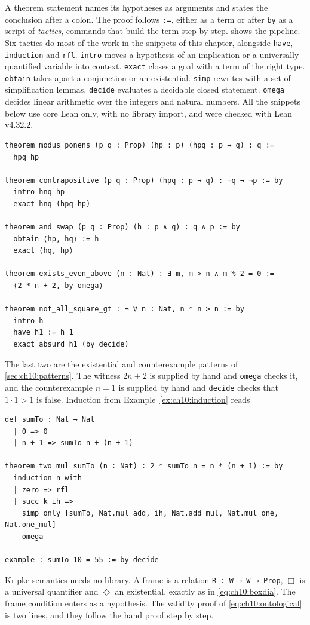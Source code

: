 A theorem statement names its hypotheses as arguments and states the conclusion after a colon. The proof follows \texttt{:=}, either as a term or after \texttt{by} as a script of \emph{tactics}, commands that build the term step by step.  shows the pipeline. Six tactics do most of the work in the snippets of this chapter, alongside \texttt{have}, \texttt{induction} and \texttt{rfl}. \texttt{intro} moves a hypothesis of an implication or a universally quantified variable into context. \texttt{exact} closes a goal with a term of the right type. \texttt{obtain} takes apart a conjunction or an existential. \texttt{simp} rewrites with a set of simplification lemmas. \texttt{decide} evaluates a decidable closed statement. \texttt{omega} decides linear arithmetic over the integers and natural numbers. All the snippets below use core Lean only, with no library import, and were checked with Lean v4.32.2.
\begin{verbatim}
theorem modus_ponens (p q : Prop) (hp : p) (hpq : p → q) : q :=
  hpq hp

theorem contrapositive (p q : Prop) (hpq : p → q) : ¬q → ¬p := by
  intro hnq hp
  exact hnq (hpq hp)

theorem and_swap (p q : Prop) (h : p ∧ q) : q ∧ p := by
  obtain ⟨hp, hq⟩ := h
  exact ⟨hq, hp⟩

theorem exists_even_above (n : Nat) : ∃ m, m > n ∧ m % 2 = 0 :=
  ⟨2 * n + 2, by omega⟩

theorem not_all_square_gt : ¬ ∀ n : Nat, n * n > n := by
  intro h
  have h1 := h 1
  exact absurd h1 (by decide)
\end{verbatim}
The last two are the existential and counterexample patterns of \cref{sec:ch10:patterns}. The witness $2n+2$ is supplied by hand and \texttt{omega} checks it, and the counterexample $n=1$ is supplied by hand and \texttt{decide} checks that $1\cdot1>1$ is false. Induction from Example~\ref{ex:ch10:induction} reads
\begin{verbatim}
def sumTo : Nat → Nat
  | 0 => 0
  | n + 1 => sumTo n + (n + 1)

theorem two_mul_sumTo (n : Nat) : 2 * sumTo n = n * (n + 1) := by
  induction n with
  | zero => rfl
  | succ k ih =>
    simp only [sumTo, Nat.mul_add, ih, Nat.add_mul, Nat.mul_one, Nat.one_mul]
    omega

example : sumTo 10 = 55 := by decide
\end{verbatim}
Kripke semantics needs no library. A frame is a relation \texttt{R : W → W → Prop}, $\Box$ is a universal quantifier and $\Diamond$ an existential, exactly as in \eqref{eq:ch10:boxdia}. The frame condition enters as a hypothesis. The validity proof of \eqref{eq:ch10:ontological} is two lines, and they follow the hand proof step by step.
